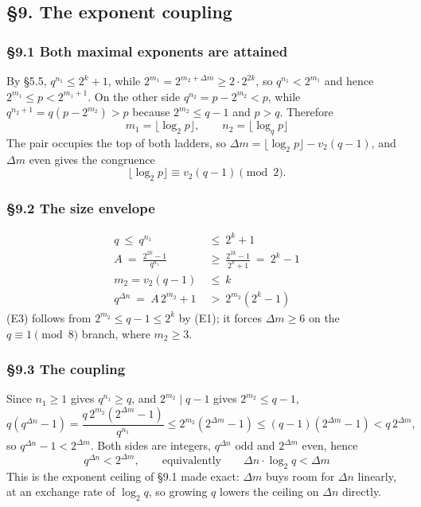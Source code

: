 \documentclass[11pt]{article}
\begin{document}
\subsection*{\S9. The exponent coupling}

\subsubsection*{\S9.1 Both maximal exponents are attained}

By \S5.5, $q^{n_1} \leq 2^{k}+1$, while $2^{m_1} = 2^{m_2+\Delta m} \geq 2\cdot 2^{2k}$, so $q^{n_1} < 2^{m_1}$ and hence $2^{m_1} \leq p < 2^{m_1+1}$. On the other side $q^{n_2} = p - 2^{m_2} < p$, while $q^{n_2+1} = q\left(p-2^{m_2}\right) > p$ because $2^{m_2} \leq q-1$ and $p > q$. Therefore
\[
\boxed{\,m_1 = \lfloor \log_2 p \rfloor, \qquad n_2 = \lfloor \log_q p \rfloor\,}
\]
The pair occupies the top of both ladders, so $\Delta m = \lfloor \log_2 p\rfloor - v_2(q-1)$, and $\Delta m$ even gives the congruence
\[
\lfloor \log_2 p \rfloor \equiv v_2(q-1) \pmod 2 .
\]

\subsubsection*{\S9.2 The size envelope}

\begin{align}
q \ \leq \ q^{n_1} \ &\leq \ 2^{k}+1 \tag{E1}\\
A \ = \ \frac{2^{2k}-1}{q^{n_1}} \ &\geq \ \frac{2^{2k}-1}{2^{k}+1} \ = \ 2^{k}-1 \tag{E2}\\
m_2 = v_2(q-1) \ &\leq \ k \tag{E3}\\
q^{\Delta n} \ = \ A\,2^{m_2}+1 \ &> \ 2^{m_2}\left(2^{k}-1\right) \tag{E4}
\end{align}
(E3) follows from $2^{m_2} \leq q-1 \leq 2^{k}$ by (E1); it forces $\Delta m \geq 6$ on the $q \equiv 1 \pmod 8$ branch, where $m_2 \geq 3$.

\subsubsection*{\S9.3 The coupling}

Since $n_1 \geq 1$ gives $q^{n_1} \geq q$, and $2^{m_2} \mid q-1$ gives $2^{m_2} \leq q-1$,
\[
q\left(q^{\Delta n}-1\right) = \frac{q\,2^{m_2}\left(2^{\Delta m}-1\right)}{q^{n_1}} \leq 2^{m_2}\left(2^{\Delta m}-1\right) \leq (q-1)\left(2^{\Delta m}-1\right) < q\,2^{\Delta m},
\]
so $q^{\Delta n}-1 < 2^{\Delta m}$. Both sides are integers, $q^{\Delta n}$ odd and $2^{\Delta m}$ even, hence
\[
\boxed{\,q^{\Delta n} < 2^{\Delta m}, \qquad\text{equivalently}\qquad \Delta n \cdot \log_2 q < \Delta m\,}
\]
This is the exponent ceiling of \S9.1 made exact: $\Delta m$ buys room for $\Delta n$ linearly, at an exchange rate of $\log_2 q$, so growing $q$ lowers the ceiling on $\Delta n$ directly.
\end{document}
